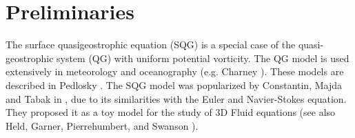 %
%
%
%
%
%
%
%
%
%
%

\section{Preliminaries} \label{preliminaries}
The surface quasigeostrophic equation (SQG) is a special case of the quasi-geostrophic system (QG) with uniform potential vorticity. The QG model is used extensively in meteorology and oceanography (e.g. Charney \cite{Ch}). These models are described in Pedlosky \cite{Pe}. The SQG model was popularized by Constantin, Majda and Tabak in \cite{CoMaTa}, due to its similarities with the Euler and Navier-Stokes  equation. They proposed it as a toy model for the study of 3D Fluid equations (see also Held, Garner, Pierrehumbert, and Swanson \cite{GaHePiSw}). 

